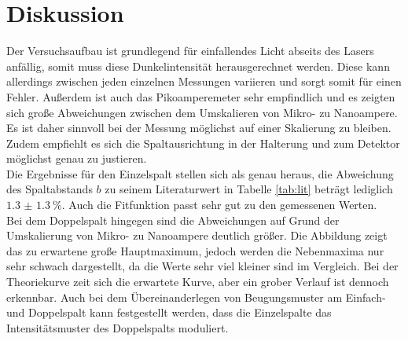 \section{Diskussion}

Der Versuchsaufbau ist grundlegend für einfallendes Licht abseits des Lasers anfällig, somit muss diese Dunkelintensität herausgerechnet werden. Diese kann allerdings zwischen jeden einzelnen
Messungen variieren und sorgt somit für einen Fehler. Außerdem ist auch das Pikoamperemeter sehr empfindlich und es zeigten sich große Abweichungen zwischen dem Umskalieren von Mikro- zu Nanoampere. Es ist daher sinnvoll bei der Messung möglichst
auf einer Skalierung zu bleiben. Zudem empfiehlt es sich die Spaltausrichtung in der Halterung und zum Detektor möglichst genau zu justieren.
\\
\newline
Die Ergebnisse für den Einzelspalt stellen sich als genau heraus, die Abweichung des Spaltabstands $b$ zu seinem Literaturwert in Tabelle \ref{tab:lit} beträgt lediglich $\SI{1.3(13)}{\percent}$. Auch die Fitfunktion passt sehr gut zu den
gemessenen Werten.
\\
\newline
Bei dem Doppelspalt hingegen sind die Abweichungen auf Grund der Umskalierung von Mikro- zu Nanoampere deutlich größer. Die Abbildung zeigt das zu erwartene große Hauptmaximum, jedoch werden die Nebenmaxima nur sehr schwach dargestellt, da die 
Werte sehr viel kleiner sind im Vergleich. Bei der Theoriekurve zeit sich die erwartete Kurve, aber ein grober Verlauf ist dennoch erkennbar. Auch bei dem Übereinanderlegen von Beugungsmuster am Einfach- und Doppelspalt kann festgestellt werden, dass
die Einzelspalte das Intensitätsmuster des Doppelspalts moduliert.
